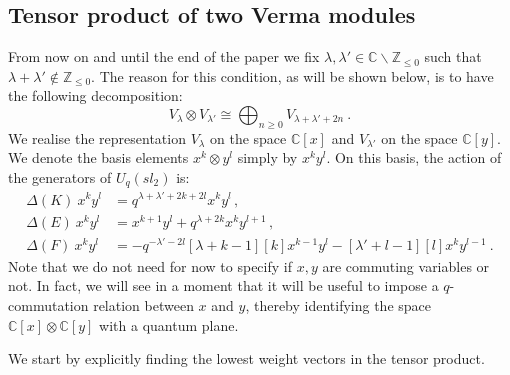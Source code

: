 \documentclass[a4paper,12pt]{article}
\numberwithin{equation}{section}
\newcommand{\C}{\mathbb{C}}
\newcommand{\Z}{\mathbb{Z}}
\theoremstyle{rem}
\theoremstyle{definition}
\begin{document}
\subsection{Tensor product of two Verma modules}

From now on and until the end of the paper we fix $\lambda,\lambda'\in \C\backslash\Z_{\leq 0}$ such that $\lambda+\lambda'\notin \mathbb{Z}_{\leq 0}$. The reason for this condition, as will be shown below, is to have the following decomposition:
\[V_\lambda\otimes V_{\lambda'}\cong \bigoplus_{n\geq0} V_{\lambda+\lambda'+2n}\ .\]
We realise the representation $V_\lambda$ on the space $\C[x]$ and $V_{\lambda'}$ on the space $\C[y]$. We denote the basis elements $x^k\otimes y^l$ simply by $x^ky^l$. On this basis, the action of the generators of $U_q(sl_2)$ is:
\begin{align}
\Delta(K)~x^ky^l&=q^{\lambda+\lambda'+2k+2l}x^ky^l\,,\label{actKxy}\\
\Delta(E)~x^ky^l&=x^{k+1}y^l+q^{\lambda+2k}x^ky^{l+1}\,,\label{actExy}\\
\Delta(F)~x^ky^l&= -q^{-\lambda'-2l}[\lambda+k-1][k] x^{k-1}y^l -[\lambda'+l-1][l] x^ky^{l-1}\ .\label{actFxy}
\end{align}
Note that we do not need for now to specify if $x,y$ are commuting variables or not. In fact, we will see in a moment that it will be useful to impose a $q$-commutation relation between $x$ and $y$, thereby identifying the space $\C[x]\otimes \C[y]$ with a quantum plane.

We start by explicitly finding the lowest weight vectors in the tensor product.
\end{document}
